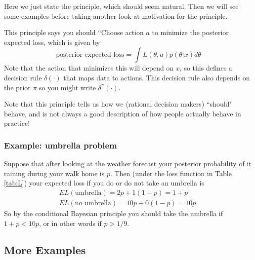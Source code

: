 \documentclass[12pt]{article}
\begin{document}
Here we just state the principle, which should seem natural.
Then we will see some examples before taking another look
at motivation for the principle.

This principle says you should ``Choose action $a$ to minimize the posterior expected loss, which is given by
\begin{equation}
\text{posterior expected loss}= \int L(\theta, a) p(\theta | x) d\theta
\end{equation}
Note that the action that minimizes this will depend on $x$, so this defines a decision rule $\delta(\cdot)$ that
maps data to actions. This decision rule also depends on the prior $\pi$ so you might write $\delta^\pi(\cdot)$.

Note that this principle tells us how we (rational decision makers)
``should" behave, and is
not always a good description of how people actually behave
in practice!


\subsubsection{Example: umbrella problem}

Suppose that after looking at the weather forecast your posterior probability of it raining during your
walk home is $p$. Then (under the loss function in Table \ref{tab:L}) your expected loss if you do or do not take an umbrella is
\begin{gather}
EL(\text{umbrella}) = 2p + 1(1-p) = 1+p \\
EL(\text{no umbrella}) = 10p + 0(1-p) = 10p.
\end{gather}
So by the conditional Bayesian principle you should take the umbrella if $1+p<10p$, or in other words if $p>1/9$.

\subsection{More Examples}
\end{document}
